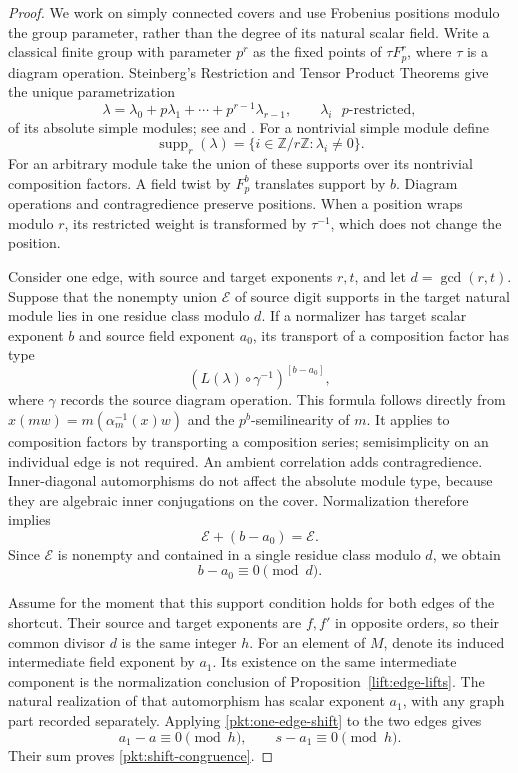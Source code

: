 \begin{proof}
We work on simply connected covers and use Frobenius positions
modulo the group parameter, rather than the degree of its
natural scalar field.  Write a classical finite group with
parameter $p^r$ as the fixed points of $\tau F_p^r$, where
$\tau$ is a diagram operation.  Steinberg's Restriction and
Tensor Product Theorems give the unique parametrization
\[
 \lambda=\lambda_0+p\lambda_1+\cdots+p^{r-1}\lambda_{r-1},
 \qquad\lambda_i\text{ $p$-restricted},
\]
of its absolute simple modules; see
\cite[Theorems~41 and~43]{SteinbergNotes} and
\cite{Steinberg1963}.  For a nontrivial simple module define
\[
 \operatorname{supp}_r(\lambda)
       =\{i\in\mathbb Z/r\mathbb Z:\lambda_i\ne0\}.
\]
For an arbitrary module take the union of these supports over
its nontrivial composition factors.  A field twist by $F_p^b$
translates support by $b$.  Diagram operations and
contragredience preserve positions.  When a position wraps
modulo $r$, its restricted weight is transformed by
$\tau^{-1}$, which does not change the position.

Consider one edge, with source and target exponents $r,t$, and
let $d=\gcd(r,t)$.  Suppose that the nonempty union $\mathcal E$
of source digit supports in the target natural module lies in
one residue class modulo $d$.  If a normalizer has target
scalar exponent $b$ and source field exponent $a_0$, its
transport of a composition factor has type
\[
                  (L(\lambda)\circ\gamma^{-1})^{[b-a_0]},
\]
where $\gamma$ records the source diagram operation.  This
formula follows directly from
$x(mw)=m(\alpha_m^{-1}(x)w)$ and the $p^b$-semilinearity of
$m$.  It applies to composition factors by transporting a
composition series; semisimplicity on an individual edge is
not required.  An ambient correlation adds contragredience.
Inner-diagonal automorphisms do not affect the absolute module
type, because they are algebraic inner conjugations on the
cover.  Normalization therefore implies
\[
                  \mathcal E+(b-a_0)=\mathcal E.
\]
Since $\mathcal E$ is nonempty and contained in a single
residue class modulo $d$, we obtain
\begin{equation}
                          b-a_0\equiv0\pmod d.
\label{pkt:one-edge-shift}
\end{equation}

Assume for the moment that this support condition holds for both
edges of the shortcut.  Their source and target exponents are $f,f'$
in opposite orders, so their common divisor $d$ is the same integer $h$.
For an element of $M$, denote its induced intermediate field
exponent by $a_1$.  Its existence on the same intermediate
component is the normalization conclusion of
Proposition~\ref{lift:edge-lifts}.  The natural realization of that
automorphism has scalar exponent $a_1$, with any graph part
recorded separately.  Applying
\eqref{pkt:one-edge-shift} to the two edges gives
\[
                 a_1-a\equiv0\pmod h,\qquad
                 s-a_1\equiv0\pmod h.
\]
Their sum proves \eqref{pkt:shift-congruence}.


\end{proof}
